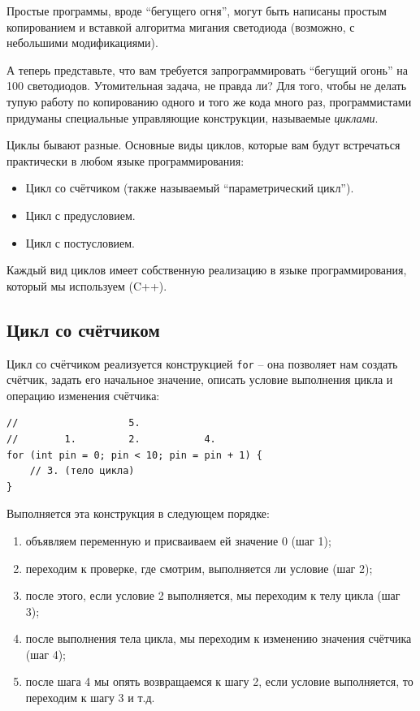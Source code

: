 \documentclass[a4paper,twoside]{book}
\begin{document}
Простые программы, вроде ``бегущего огня'', могут быть написаны простым
копированием и вставкой алгоритма мигания светодиода (возможно, с небольшими
модификациями).

А теперь представьте, что вам требуется запрограммировать ``бегущий огонь'' на
100 светодиодов. Утомительная задача, не правда ли? Для того, чтобы не делать
тупую работу по копированию одного и того же кода много раз, программистами
придуманы специальные управляющие конструкции, называемые \emph{циклами}.

Циклы бывают разные. Основные виды циклов, которые вам будут встречаться
практически в любом языке программирования:
\begin{itemize}
\item Цикл со счётчиком (также называемый ``параметрический цикл'').
\item Цикл с предусловием.
\item Цикл с постусловием.
\end{itemize}

Каждый вид циклов имеет собственную реализацию в языке программирования, который
мы используем (C++).

\subsection{Цикл со счётчиком}

Цикл со счётчиком реализуется конструкцией \texttt{for} -- она позволяет нам
создать счётчик, задать его начальное значение, описать условие выполнения цикла
и операцию изменения счётчика:

\begin{verbatim}
//                   5.
//        1.         2.           4.
for (int pin = 0; pin < 10; pin = pin + 1) {
    // 3. (тело цикла)
}
\end{verbatim}

Выполняется эта конструкция в следующем порядке:
\begin{enumerate}
\item объявляем переменную и присваиваем ей значение 0 (шаг 1);
\item переходим к проверке, где смотрим, выполняется ли условие (шаг 2);
\item после этого, если условие 2 выполняется, мы переходим к телу цикла (шаг 3);
\item после выполнения тела цикла, мы переходим к изменению значения счётчика (шаг 4);
\item после шага 4 мы опять возвращаемся к шагу 2, если условие выполняется, то
  переходим к шагу 3 и т.д.
\end{enumerate}
\end{document}
